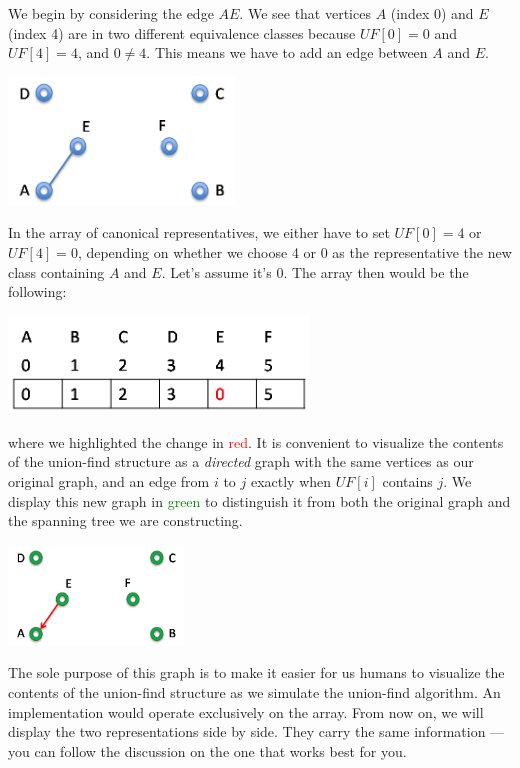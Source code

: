 We begin by considering the edge $AE$.  We see that vertices $A$
(index 0) and $E$ (index 4) are in two
different equivalence classes because $\mathit{UF}[0] = 0$ and $\mathit{UF}[4] = 4$,
and $0 \neq 4$.  This means we have to add an edge between
$A$ and $E$.
\begin{center}
  \includegraphics[width=0.45\textwidth]{img/forest1.png}
\end{center}
In the array of canonical representatives, we either have to set
$\mathit{UF}[0] = 4$ or $\mathit{UF}[4] = 0$, depending on whether we choose 4 or 0 as
the representative the new class containing $A$ and $E$.  Let's assume
it's 0.  The array then would be the following:
\begin{center}
  \includegraphics[width=0.6\textwidth]{img/ufs1.png}
\end{center}
where we highlighted the change in \textcolor{red}{red}.  It is
convenient to visualize the contents of the union-find structure as a
\emph{directed} graph with the same vertices as our original graph,
and an edge from $i$ to $j$ exactly when $\mathit{UF}[i]$ contains $j$.  We
display this new graph in \textcolor{green}{green} to distinguish it
from both the original graph and the spanning tree we are
constructing.
\begin{center}
  \includegraphics[width=0.35\textwidth]{img/ufg1.png}
\end{center}
The sole purpose of this graph is to make it easier for us humans to
visualize the contents of the union-find structure as we simulate the
union-find algorithm.  An implementation would operate exclusively on
the array.  From now on, we will display the two representations side
by side.  They carry the same information --- you can follow the
discussion on the one that works best for you.


